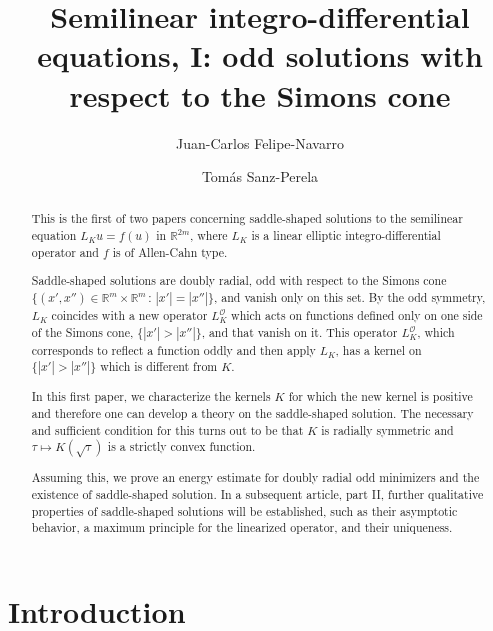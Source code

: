 \documentclass[12pt,reqno]{amsart}
\title[Semilinear integro-differential equations I]{Semilinear integro-differential equations, I: odd solutions with respect to the Simons cone}
\author{Juan-Carlos Felipe-Navarro}
\author{Tomás Sanz-Perela}
\theoremstyle{definition}
\theoremstyle{remark}
\newcommand{\con}[1]{\mathbb{#1}}
\newcommand{\R}{\con{R}} %
\newcommand{\ocal}{\mathcal{O}}
\numberwithin{equation}{section}
\begin{document}
	
	
	\begin{abstract}
		This is the first of two papers concerning saddle-shaped solutions to the semilinear equation $L_K u = f(u)$ in $\R^{2m}$, where $L_K$ is a linear elliptic integro-differential operator and $f$ is of Allen-Cahn type. 
		
		Saddle-shaped solutions are doubly radial, odd with respect to the Simons cone $\{(x', x'') \in \R^m \times \R^m \, : \, |x'| = |x''|\}$, and vanish only on this set. By the odd symmetry, $L_K$ coincides with a new operator $L_K^\ocal$ which acts on functions defined only on one side of the Simons cone, $\{|x'|>|x''|\}$, and that vanish on it. This operator $L_K^\ocal$, which corresponds to reflect a function oddly and then apply $L_K$, has a kernel on $\{|x'|>|x''|\}$ which is different from $K$. 
		
		In this first paper, we characterize the kernels $K$ for which the new kernel is positive and therefore one can develop a theory on the saddle-shaped solution. The necessary and sufficient condition for this turns out to be that $K$ is radially symmetric and $\tau\mapsto K(\sqrt \tau)$ is a strictly convex function. 
		
		Assuming this, we prove an energy estimate for doubly radial odd minimizers and the existence of saddle-shaped solution. In a subsequent article, part II, further qualitative properties of saddle-shaped solutions will be established, such as their asymptotic behavior, a maximum principle for the linearized operator, and their uniqueness.
	\end{abstract}
	
	
	\maketitle
	
	\tableofcontents
	
	\section{Introduction}
	\label{Sec:Introduction}
	
\end{document}
